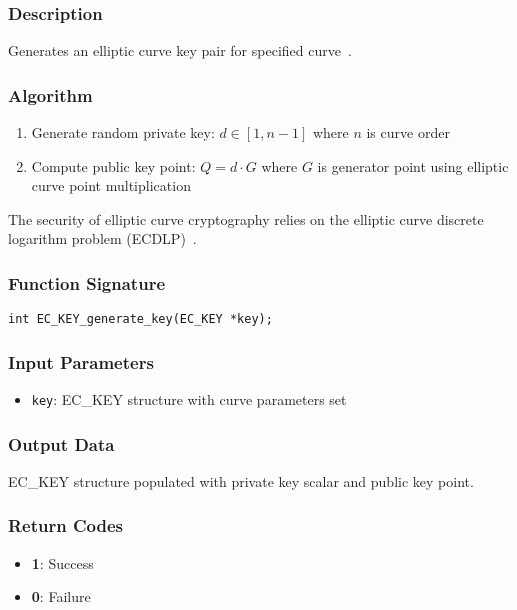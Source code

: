 \subsubsection{Description}
Generates an elliptic curve key pair for specified curve~\cite{hankerson2006guide, koblitz1987elliptic}.

\subsubsection{Algorithm}
\begin{enumerate}
    \item Generate random private key: $d \in [1, n-1]$ where $n$ is curve order
    \item Compute public key point: $Q = d \cdot G$ where $G$ is generator point using elliptic curve point multiplication
\end{enumerate}

The security of elliptic curve cryptography relies on the elliptic curve discrete logarithm problem (ECDLP)~\cite{miller1986use}.

\subsubsection{Function Signature}
\begin{verbatim}
int EC_KEY_generate_key(EC_KEY *key);
\end{verbatim}

\subsubsection{Input Parameters}
\begin{itemize}
    \item \texttt{key}: EC\_KEY structure with curve parameters set
\end{itemize}

\subsubsection{Output Data}
EC\_KEY structure populated with private key scalar and public key point.

\subsubsection{Return Codes}
\begin{itemize}
    \item \textbf{1}: Success
    \item \textbf{0}: Failure
\end{itemize}


